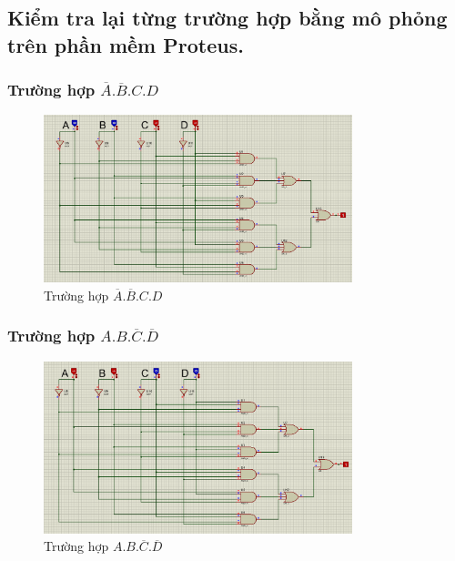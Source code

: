     \subsection{Kiểm tra lại từng trường hợp bằng mô phỏng trên phần mềm Proteus.}
        \subsubsection{Trường hợp $\overline{A}.\overline{B}.C.D$}
            \begin{figure}[H]
                \centering
                \includegraphics[width=0.8\textwidth]{pictures/b2.2.png}
                \caption{Trường hợp $\overline{A}.\overline{B}.C.D$}
            \end{figure}
        \subsubsection{Trường hợp $A.B.\overline{C}.\overline{D}$}
            \begin{figure}[H]
                \centering
                \includegraphics[width=0.8\textwidth]{pictures/b2.1.png}
                \caption{Trường hợp $A.B.\overline{C}.\overline{D}$}
            \end{figure}
